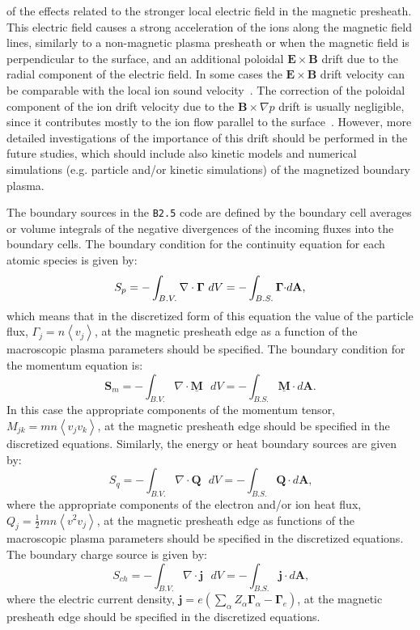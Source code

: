 \documentclass[a4paper,10pt]{report}
\begin{document}
of the effects related to the stronger local electric field in the magnetic
presheath. This electric field causes a strong acceleration of the ions
along the magnetic field lines, similarly to a non-magnetic
plasma presheath or when the magnetic field is perpendicular to
the surface, and an additional poloidal $\mathbf{E \times B}$ drift due to the
radial component of the electric field. In some cases the $\mathbf{E \times B}$
drift velocity can be comparable with the local ion sound
velocity~\cite{STANGEBY95B,ROGNLIEN99A,ROGNLIEN99B}. The correction of the
poloidal component of the ion drift velocity due to the
$\mathbf{B} \times \nabla p$ drift is usually negligible, since it contributes mostly to
the ion flow parallel to the surface~\cite{CHANKIN94AB}. However, more
detailed investigations of the importance of this drift should be performed
in the future studies, which should include also kinetic models and
numerical simulations (e.g. particle and/or kinetic simulations) of the
magnetized boundary plasma.

The boundary sources in the {\tt B2.5} code are defined by the boundary cell
averages or volume integrals of the negative divergences of the incoming
fluxes into the boundary cells. The boundary condition for the continuity
equation for each atomic species is given by:
\begin{equation}
S_{p}=-\int_{B.V.}\nabla\cdot\mathbf{\Gamma}\text{ }dV=-\int_{B.S.}\mathbf{%
\Gamma\cdot} d\mathbf{A}\text{,}   \label{1}
\end{equation}
which means that in the discretized form of this equation the value of the
particle flux, $\Gamma_{j}=n\left\langle v_{j}\right\rangle $, at the
magnetic presheath edge as a function of the macroscopic plasma parameters
should be specified. The boundary condition for the momentum equation is:
\begin{equation}
\mathbf{S}_{m}=-\int_{B.V.}\nabla\cdot\underline{\mathbf{M}}\text{ }%
dV=-\int_{B.S.}\underline{\mathbf{M}}\cdot d\mathbf{A}\text{.}   \label{2}
\end{equation}
In this case the appropriate components of the momentum tensor,
$M_{jk}=mn\left\langle v_{j}v_{k}\right\rangle $, at the magnetic presheath
edge should be specified in the discretized equations. Similarly, the energy
or heat boundary sources are given by:
\begin{equation}
S_{q}=-\int_{B.V.}\nabla\cdot\mathbf{Q}\text{ }dV=-\int_{B.S.}\mathbf{Q\cdot}%
d\mathbf{A}\text{,}   \label{3}
\end{equation}
where the appropriate components of the electron and/or ion heat flux,
$Q_{j}=\frac{1}{2}mn\left\langle v^{2}v_{j}\right\rangle $, at the magnetic
presheath edge as functions of the macroscopic plasma parameters should be
specified in the discretized equations. The boundary charge source is given
by:
\begin{equation}
S_{ch}=-\int_{B.V.}\nabla\cdot\mathbf{j}\text{ }dV=-\int_{B.S.}\mathbf{j\cdot%
}d\mathbf{A}\text{,}   \label{4}
\end{equation}
where the electric current density, $\mathbf{j}=e\left( \sum_{\alpha
}Z_{\alpha}\mathbf{\Gamma}_{\alpha}-\mathbf{\Gamma}_{e}\right) $, at the
magnetic presheath edge should be specified in the discretized equations.
\end{document}
